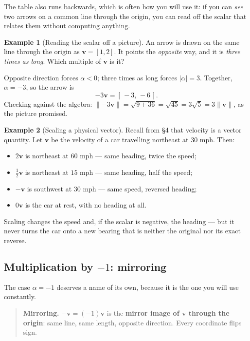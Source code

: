 \documentclass[11pt]{article}
\theoremstyle{definition}
\newtheorem{ex}{Example}[section]
\theoremstyle{remark}
\newcommand{\vc}[1]{\mathbf{#1}}
\newcommand{\norm}[1]{\lVert #1\rVert}
\begin{document}
\noindent The table also runs backwards, which is often how you will use it: if
you can \emph{see} two arrows on a common line through the origin, you can read
off the scalar that relates them without computing anything.

\begin{ex}[Reading the scalar off a picture]
An arrow is drawn on the same line through the origin as $\vc{v}=[1,2]$. It
points the \emph{opposite} way, and it is \emph{three times as long}. Which
multiple of $\vc{v}$ is it?

Opposite direction forces $\alpha<0$; three times as long forces
$\lvert\alpha\rvert=3$. Together, $\alpha=-3$, so the arrow is
\[
  -3\vc{v}=[\,-3,\,-6\,].
\]
Checking against the algebra:
$\norm{-3\vc{v}}=\sqrt{9+36}=\sqrt{45}=3\sqrt5=3\norm{\vc{v}}$, as the picture
promised.
\end{ex}

\begin{ex}[Scaling a physical vector]
Recall from \S4 that velocity is a vector quantity. Let $\vc{v}$ be the velocity
of a car travelling northeast at $30$ mph. Then:
\begin{itemize}[leftmargin=1.4em,itemsep=1pt,topsep=3pt]
  \item $2\vc{v}$ is northeast at $60$ mph --- same heading, twice the speed;
  \item $\tfrac12\vc{v}$ is northeast at $15$ mph --- same heading, half the speed;
  \item $-\vc{v}$ is southwest at $30$ mph --- same speed, reversed heading;
  \item $0\vc{v}$ is the car at rest, with no heading at all.
\end{itemize}
Scaling changes the speed and, if the scalar is negative, the heading --- but it
never turns the car onto a new bearing that is neither the original nor its
exact reverse.
\end{ex}

\subsection{Multiplication by $-1$: mirroring}
The case $\alpha=-1$ deserves a name of its own, because it is the one you will
use constantly.

\begin{quote}
\textbf{Mirroring.} $-\vc{v}=(-1)\vc{v}$ is the \textbf{mirror image of
$\vc{v}$ through the origin}: same line, same length, opposite direction. Every
coordinate flips sign.
\end{quote}
\end{document}

